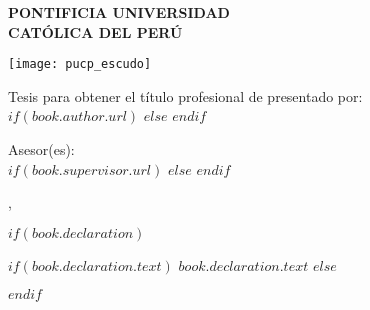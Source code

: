 \frontmatter %

\pagestyle{plain} %


\begin{titlepage}
\begin{center}

\vspace*{.06\textheight}
{\MakeUppercase{\textbf{PONTIFICIA UNIVERSIDAD \\ CATÓLICA DEL PERÚ}}\par}\vspace{0.25cm} %
\MakeUppercase{\textbf{\facname}}\vspace{0.5cm} %

\texttt{[image: pucp\_escudo]}\vspace{0.5cm}

{\textbf{\ttitle}\par}\vspace{0.4cm} %

{Tesis para obtener el título profesional de \degreename}{ presentado por:}\\[0.3cm] %

$if(book.author.url)$
\href{$book.author.url$}{\authorname} %
$else$
\authorname
$endif$

{Asesor(es):}\\[0.4cm]
$if(book.supervisor.url)$%
\href{$book.supervisor.url$}{\supname} %
$else$%
\supname
$endif$

{\cityname}{, }{\dateyearname}

\vfill
\end{center}
\end{titlepage}

$if(book.declaration)$
\begin{declaration}
\addchaptertocentry{\authorshipname} %
$if(book.declaration.text)$
$book.declaration.text$
$else$

$endif$

\end{declaration}

